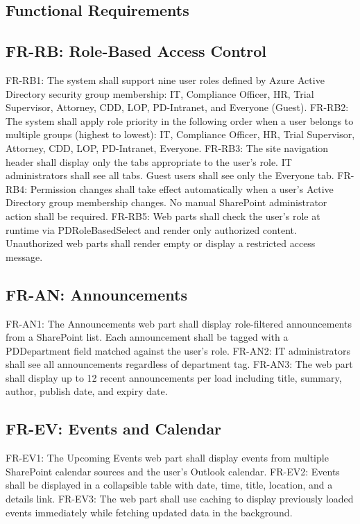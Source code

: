 \documentclass[12pt]{article}
\begin{document}
\subsection{Functional Requirements}

\subsection*{FR-RB: Role-Based Access Control}

FR-RB1: The system shall support nine user roles defined by Azure Active Directory security group membership: IT, Compliance Officer, HR, Trial Supervisor, Attorney, CDD, LOP, PD-Intranet, and Everyone (Guest). FR-RB2: The system shall apply role priority in the following order when a user belongs to multiple groups (highest to lowest): IT, Compliance Officer, HR, Trial Supervisor, Attorney, CDD, LOP, PD-Intranet, Everyone. FR-RB3: The site navigation header shall display only the tabs appropriate to the user's role. IT administrators shall see all tabs. Guest users shall see only the Everyone tab. FR-RB4: Permission changes shall take effect automatically when a user's Active Directory group membership changes. No manual SharePoint administrator action shall be required. FR-RB5: Web parts shall check the user's role at runtime via PDRoleBasedSelect and render only authorized content. Unauthorized web parts shall render empty or display a restricted access message.

\subsection*{FR-AN: Announcements}

FR-AN1: The Announcements web part shall display role-filtered announcements from a SharePoint list. Each announcement shall be tagged with a PDDepartment field matched against the user's role. FR-AN2: IT administrators shall see all announcements regardless of department tag. FR-AN3: The web part shall display up to 12 recent announcements per load including title, summary, author, publish date, and expiry date.

\subsection*{FR-EV: Events and Calendar}

FR-EV1: The Upcoming Events web part shall display events from multiple SharePoint calendar sources and the user's Outlook calendar. FR-EV2: Events shall be displayed in a collapsible table with date, time, title, location, and a details link. FR-EV3: The web part shall use caching to display previously loaded events immediately while fetching updated data in the background.
\end{document}

